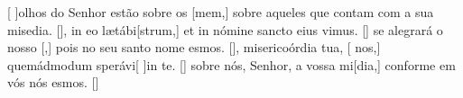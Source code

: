 {    {[ ]{o}lhos do Senhor estão sobre os [mem,] sobre aqueles que contam com a sua misedia. [\LinkPT]},
  { in eo lætábi[strum,] et in nómine sancto eius vimus. [\LinkLA]}%
    { se alegrará o nosso [,] pois no seu santo nome esmos. [\LinkPT]},
  { misericoórdia tua, [ nos,] quemádmodum sperávi[ ]{in} te. [\LinkLA]}%
    { sobre nós, Senhor, a vossa mi[dia,] conforme em vós nós esmos. [\LinkPT]}
}